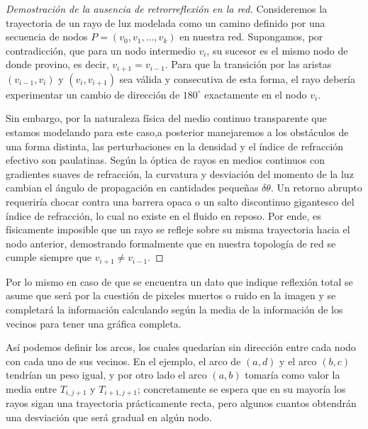 \begin{proof}[Demostración de la ausencia de retrorreflexión en la red]

    Consideremos la trayectoria de un rayo de luz modelada como un camino definido por una secuencia de nodos $P = (v_0, v_1, \dots, v_k)$ en nuestra red. Supongamos, por contradicción, que para un nodo intermedio $v_i$, su sucesor es el mismo nodo de donde provino, es decir, $v_{i+1} = v_{i-1}$. Para que la transición por las aristas $(v_{i-1}, v_i)$ y $(v_i, v_{i+1})$ sea válida y consecutiva de esta forma, el rayo debería experimentar un cambio de dirección de $180^\circ$ exactamente en el nodo $v_i$.
    
    Sin embargo, por la naturaleza física del medio continuo transparente que estamos modelando para este caso,a posterior manejaremos a los obstáculos de una forma distinta, las perturbaciones en la densidad y el índice de refracción efectivo son paulatinas. Según la óptica de rayos en medios continuos con gradientes suaves de refracción, la curvatura y desviación del momento de la luz cambian el ángulo de propagación en cantidades pequeñas $\delta \theta$. Un retorno abrupto requeriría chocar contra una barrera opaca o un salto discontinuo gigantesco del índice de refracción, lo cual no existe en el fluido en reposo. Por ende, es físicamente imposible que un rayo se refleje sobre su misma trayectoria hacia el nodo anterior, demostrando formalmente que en nuestra topología de red se cumple siempre que $v_{i+1} \neq v_{i-1}$.

\end{proof}

Por lo mismo en caso de que se encuentra un dato que indique reflexión total se asume que será por la cuestión de pixeles muertos o ruido en la imagen y se completará la información calculando según la media de la información de los vecinos para tener una gráfica completa.

Así podemos definir los arcos, los cuales quedarían sin dirección entre cada nodo con cada uno de sus vecinos. En el ejemplo, el arco de $(a,d)$ y el arco $(b,c)$ tendrían un peso igual, y por otro lado el arco $(a,b)$ tomaría como valor la media entre $T_{i,j+1}$ y $T_{i+1,j+1}$; concretamente se espera que en su mayoría los rayos sigan una trayectoria prácticamente recta, pero algunos cuantos obtendrán una desviación que será gradual en algún nodo.

